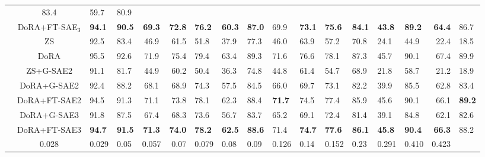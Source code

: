 \begin{table}[!htbp]
{\begin{tabular}{lc A B C D E F G H I J K L M N O}
    & 83.4 & 59.7 & 80.9 \\
  & DoRA+FT-SAE$_3$
    & \bf94.1 & \bf90.5 & \bf69.3 & \bf72.8 & \bf76.2 & \bf60.3
    & \bf87.0 & 69.9 & \bf73.1 & \bf75.6 & \bf84.1 & \bf43.8
    & \bf89.2 & \bf64.4 & 86.7 \\
\midrule
  & ZS
    & 92.5 & 83.4 & 46.9 & 61.5 & 51.8 & 37.9
    & 77.3 & 46.0 & 63.9 & 57.2 & 70.8 & 24.1
    & 44.9 & 22.4 & 18.5 \\
  & DoRA
    & 95.5 & 92.6 & 71.9 & 75.4 & 79.4 & 63.4
    & 89.3 & 71.6 & 76.6 & 78.1 & 87.3 & 45.7
    & 90.1 & 67.4 & 89.9 \\
  \cmidrule(l){2-17}
  & ZS+G-SAE2
    & 91.1 & 81.7 & 44.9 & 60.2 & 50.4 & 36.3
    & 74.8 & 44.8 & 61.4 & 54.7 & 68.9 & 21.8
    & 58.7 & 21.2 & 18.9 \\
  & DoRA+G-SAE2
    & 92.4 & 88.2 & 68.1 & 68.9 & 74.3 & 57.5
    & 84.5 & 66.0 & 69.7 & 73.1 & 82.2 & 39.9
    & 85.5 & 62.8 & 83.4 \\
  & DoRA+FT-SAE2
    & 94.5 & 91.3 & 71.1 & 73.8 & 78.1 & 62.3
    & 88.4 & \bf71.7 & 74.5 & 77.4 & 85.9 & 45.6
    & 90.1 & 66.1 & \bf89.2 \\
  & DoRA+G-SAE3
    & 91.8 & 87.5 & 67.4 & 68.3 & 73.6 & 56.7
    & 83.7 & 65.2 & 69.1 & 72.4 & 81.4 & 39.1
    & 84.8 & 62.1 & 82.6 \\
  & DoRA+FT-SAE3
    & \bf94.7 & \bf91.5 & \bf71.3 & \bf74.0 & \bf78.2 & \bf62.5
    & \bf88.6 & 71.4 & \bf74.7 & \bf77.6 & \bf86.1 & \bf45.8
    & \bf90.4 & \bf66.3 & 88.2 \\
\midrule
{}
  & 0.028 & 0.029 & 0.05 & 0.057 & 0.07 & 0.079 & 0.08 & 0.09
  & 0.126 & 0.14 & 0.152 & 0.23 & 0.291 & 0.410 & 0.423\\
\bottomrule
\end{tabular}%
}
\end{table}
